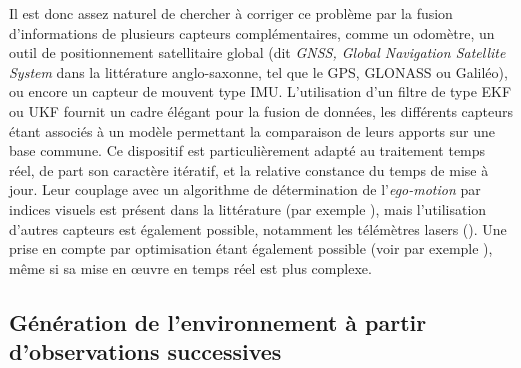 Il est donc assez naturel de chercher à corriger ce problème par la fusion d'informations de plusieurs capteurs complémentaires, comme un odomètre, un outil de positionnement satellitaire global (dit \emph{GNSS, Global Navigation Satellite System} dans la littérature anglo-saxonne, tel que le GPS, GLONASS ou Galiléo), ou encore un capteur de mouvent type IMU. L'utilisation d'un filtre de type EKF ou UKF fournit un cadre élégant pour la fusion de données, les différents capteurs étant associés à un modèle permettant la comparaison de leurs apports sur une base commune. Ce dispositif est particulièrement adapté au traitement temps réel, de part son caractère itératif, et la relative constance du temps de mise à jour. Leur couplage avec un algorithme de détermination de l’\emph{ego-motion} par indices visuels est présent dans la littérature (par exemple \cite{Singh2005,Bak2011}), mais l'utilisation d'autres capteurs est également possible, notamment les télémètres lasers (\cite{Weyers2011}). Une prise en compte par optimisation étant également possible (voir par exemple \cite{Martinelli2012}), même si sa mise en œuvre en temps réel est plus complexe.

\subsection{Génération de l'environnement à partir d'observations successives}
